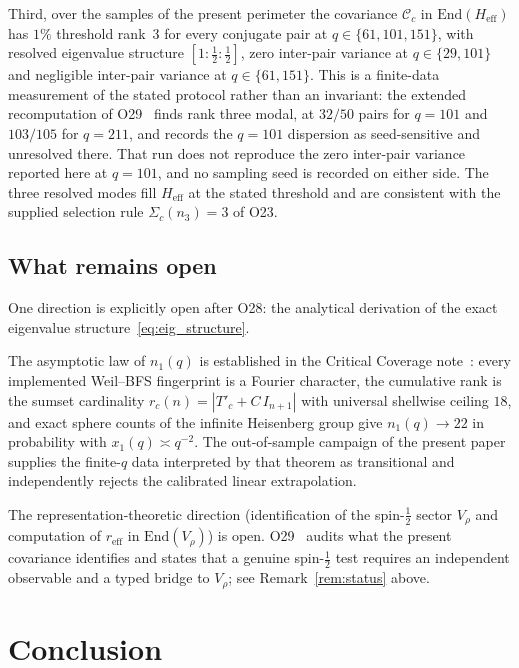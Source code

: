 \documentclass[11pt,a4paper]{article}
\theoremstyle{definition}
\begin{document}
    Third, over the samples of the present perimeter the covariance $\mathcal{C}_c$ in
    $\mathrm{End}(H_{\mathrm{eff}})$ has $1\%$ threshold rank~$3$ for every conjugate pair at
    $q \in \{61, 101, 151\}$, with resolved eigenvalue structure
    $[1 : \tfrac{1}{2} : \tfrac{1}{2}]$, zero inter-pair variance at $q \in \{29, 101\}$ and
    negligible inter-pair variance at $q \in \{61, 151\}$.
    This is a finite-data measurement of the stated protocol rather than an invariant: the extended
    recomputation of O29~\cite{Beau2026a33} finds rank three modal, at $32/50$ pairs for $q = 101$
    and $103/105$ for $q = 211$, and records the $q = 101$ dispersion as seed-sensitive and
    unresolved there.
    That run does not reproduce the zero inter-pair variance reported here at $q = 101$, and no
    sampling seed is recorded on either side.
    The three resolved modes fill $H_{\mathrm{eff}}$ at the stated threshold and are consistent with
    the supplied selection rule $\Sigma_c(n_3) = 3$ of O23.

  \subsection{What remains open}

    One direction is explicitly open after O28: the analytical derivation of the exact eigenvalue
    structure~\eqref{eq:eig_structure}.

    The asymptotic law of $n_1(q)$ is established in the Critical Coverage
    note~\cite{Beau2026ccnote}: every implemented Weil--BFS fingerprint is a Fourier character, the
    cumulative rank is the sumset cardinality $r_c(n) = |T'_c + C\,I_{n+1}|$ with universal
    shellwise ceiling $18$, and exact sphere counts of the infinite Heisenberg group give
    $n_1(q) \to 22$ in probability with $x_1(q) \asymp q^{-2}$.
    The out-of-sample campaign of the present paper supplies the finite-$q$ data interpreted by that
    theorem as transitional and independently rejects the calibrated linear extrapolation.

    The representation-theoretic direction (identification of the spin-$\tfrac{1}{2}$ sector
    $V_\rho$ and computation of $r_{\mathrm{eff}}$ in $\mathrm{End}(V_\rho)$) is open.
    O29~\cite{Beau2026a33} audits what the present covariance identifies and states that a genuine
    spin-$\tfrac{1}{2}$ test requires an independent observable and a typed bridge to $V_\rho$; see
    Remark~\ref{rem:status} above.

  \section{Conclusion}
\end{document}
